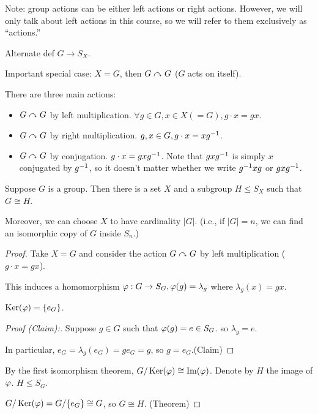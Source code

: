 \documentclass[notes.tex]{subfiles}
\begin{document}

Note: group actions can be either left actions or right actions. However, we will only talk about left actions in this course, so we will refer to them exclusively as ``actions.''


Alternate def $G\to S_X$.

Important special case: $X = G$, then $G\curvearrowright G$ ($G$ acts on itself).

There are three main actions:
\begin{itemize}
	\item $G\curvearrowright G$ by left multiplication.
	$\forall g\in G, x\in X (=G), g\cdot x = gx$.
	\item $G\curvearrowright G$ by right multiplication.
	$g, x\in G, g\cdot x = x{g}^{-1}$.
	\item $G\curvearrowright G$ by conjugation.
	$g\cdot x = g x {g}^{-1}$.
	Note that $gx{g}^{-1}$ is simply $x$ conjugated by ${g}^{-1}$, so it doesn't matter whether we write ${g}^{-1}xg$ or $gx{g}^{-1}$.
\end{itemize}

\begin{theorem}[Cayley]
	Suppose $G$ is a group. Then there is a set $X$ and a subgroup $H\le S_X$ such that $G\cong H$.

	Moreover, we can choose $X$ to have cardinality $|G|$. (i.e., if $|G| = n$, we can find an isomorphic copy of $G$ inside $S_n$.)
\end{theorem}


\begin{proof}
	Take $X = G$ and consider the action $G\curvearrowright G$ by left multiplication ($g\cdot x = gx$).

	This induces a homomorphism $\varphi:G\to S_G, \varphi(g) = \lambda_g$ where $\lambda_g(x) = gx$.
	\begin{claim}
		$\operatorname{\mathrm{Ker}}(\varphi) = \{e_G\}$.
	\end{claim}
	\begin{proof}[Proof (Claim):]
	Suppose $g\in G$ such that $\varphi(g) = e \in S_G$. so $\lambda_g = e$.

	In particular, $e_G = \lambda_g(e_G) = ge_G = g$, so $g = e_G$.\qedhere(Claim)
	\end{proof}
	By the first isomorphism theorem, $G/\operatorname{\mathrm{Ker}}(\varphi) \cong \operatorname{\mathrm{Im}}(\varphi)$. Denote by $H$ the image of $\varphi$. $H \le S_G$.

	$G/\operatorname{\mathrm{Ker}}(\varphi) = G/\{e_G\} \cong G$, so $G\cong H$. \qedhere(Theorem)
\end{proof}
\end{document}

